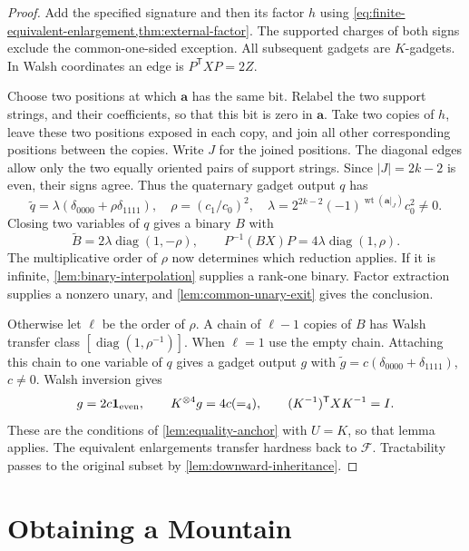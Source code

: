 \documentclass[11pt,letterpaper,onecolumn]{article}
\theoremstyle{plain}
\theoremstyle{definition}
\theoremstyle{remark}
\newcommand{\cF}{\mathcal F}
\newcommand{\diag}{\operatorname{diag}}
\newcommand{\wt}{\operatorname{wt}}
\newcommand{\Eq}{=}
\begin{document}
	\begin{proof}
		Add the specified signature and then its factor \(h\) using
		\cref{eq:finite-equivalent-enlargement,thm:external-factor}. The supported
		charges of both signs exclude the common-one-sided exception.  All subsequent gadgets are
		\(K\)-gadgets.  In Walsh coordinates an edge is
		\(P^{\mathsf T}XP=2Z\).
		
        Choose two positions at which \({\mathbf a}\) has the same bit.
        Relabel the two support strings, and their coefficients, so that this
        bit is zero in \({\mathbf a}\). Take two copies of \(h\), leave these
        two positions exposed in each copy, and join all other
		corresponding positions between the copies.  Write \(J\) for the joined
		positions.  The diagonal edges allow only the two equally oriented pairs
		of support strings.  Since \(|J|=2k-2\) is even, their signs agree.  Thus the
		quaternary gadget output \(q\) has
		\[
		\widetilde q=\lambda(\delta_{0000}+\rho\delta_{1111}),
		\quad \rho=(c_1/c_0)^2,
		\quad \lambda=2^{2k-2}(-1)^{\wt({\mathbf a}|_J)}c_0^2\ne0.
		\]
		Closing two variables of \(q\) gives a binary \(B\) with
		\[
		\widetilde B=2\lambda\diag(1,-\rho),
		\qquad P^{-1}(BX)P=4\lambda\diag(1,\rho).
		\]
		The multiplicative order of \(\rho\) now determines which
		reduction applies.  If it is infinite, \cref{lem:binary-interpolation} supplies a rank-one binary.  Factor
		extraction supplies a nonzero unary, and \cref{lem:common-unary-exit}
		gives the conclusion.
		
		Otherwise let \(\ell\) be the order of \(\rho\).  A chain of \(\ell-1\)
		copies of \(B\) has Walsh transfer class \([\diag(1,\rho^{-1})]\).
		When \(\ell=1\) use the empty chain.  Attaching this chain to one variable of
		\(q\) gives a gadget output \(g\) with
		\(\widetilde g=c(\delta_{0000}+\delta_{1111})\), \(c\ne0\).
        Walsh inversion gives
		\[
		g=2c\mathbf1_{\rm even},\qquad K^{\otimes4}g=4c(\Eq_4),
		\qquad (K^{-1})^{\mathsf T}XK^{-1}=I.
		\]
		These are the conditions of \cref{lem:equality-anchor} with \(U=K\), so
		that lemma applies.  The equivalent enlargements transfer
		hardness back to \(\cF\). Tractability passes to the original
		subset by \cref{lem:downward-inheritance}.
	\end{proof}
	
	\section{Obtaining a Mountain}
	\label{sec:factor-charge}
\end{document}
